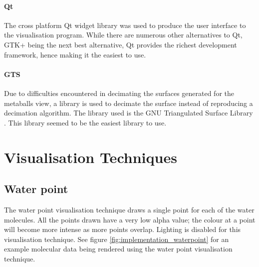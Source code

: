 
\paragraph{Qt}

The cross platform Qt widget library \citep{Qt} was used to produce the user
interface to the visualisation program. While there are numerous other
alternatives to Qt, GTK+ being the next best alternative, Qt provides the
richest development framework, hence making it the easiest to use.


\paragraph{GTS}

Due to difficulties encountered in decimating the surfaces generated for the
metaballs view, a library is used to decimate the surface instead of
reproducing a decimation algorithm. The library used is the GNU Triangulated
Surface Library \citep{GTS}. This library seemed to be the easiest library to
use.



\section{Visualisation Techniques}
\label{sec:implementation_techniques}


\subsection{Water point}
\label{sub:implementation_point}

The water point visualisation technique draws a single point for each of the
water molecules. All the points drawn have a very low alpha value; the colour
at a point will become more intense as more points overlap. Lighting is
disabled for this visualisation technique. See figure
\ref{fig:implementation_waterpoint} for an example molecular data being
rendered using the water point visualisation technique.

